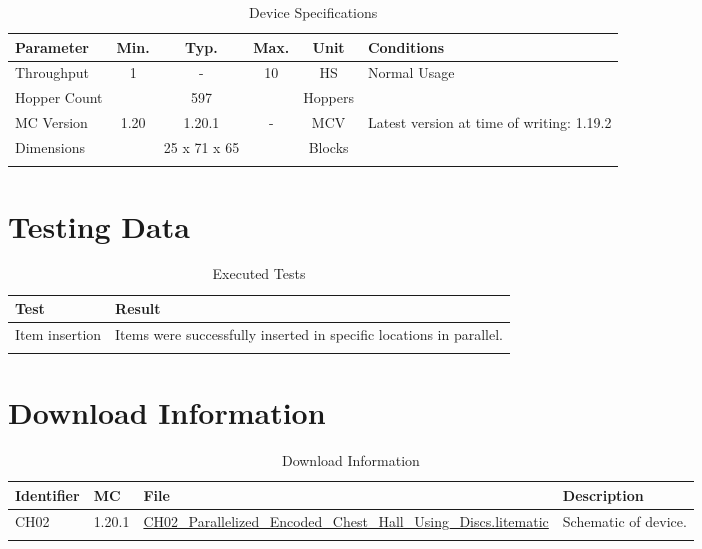 \documentclass[10pt]{datasheet}
\begin{document}
\begin{table}[H]
    \caption{Device Specifications}
    \begin{tabularx}{\textwidth}{l | c c c | c | X}
        \thickhline
        \textbf{Parameter} & \textbf{Min.} & \textbf{Typ.} & \textbf{Max.} &
        \textbf{Unit} & \textbf{Conditions} \\
        \hline
        Throughput  & 1 & - & 10 & HS & Normal Usage \\
        \hline
        Hopper Count & & 597 & & Hoppers & \\
        \hline
        MC Version & 1.20 & 1.20.1 & - & MCV & Latest version at time of writing: 1.19.2\\
        \hline
        Dimensions & & 25 x 71 x 65 & & Blocks & \\
        \thickhline
\end{tabularx}
\end{table}

\section{Testing Data}

\begin{table}[H]
\caption{Executed Tests}
\begin{tabularx}{\textwidth}{l | X}
    \thickhline
    \textbf{Test} & \textbf{Result} \\
    \hline
    Item insertion & Items were successfully inserted in specific locations in parallel. \\
    \thickhline
\end{tabularx}
\end{table}

\section{Download Information}
\begin{table}[H]
    \caption{Download Information}
    \begin{tabularx}{\textwidth}{l | l | l | X}
        \thickhline
        \textbf{Identifier} & \textbf{MC} & \textbf{File} & \textbf{Description} \\
        \hline
        CH02 & 1.20.1 & \href{https://github.com/Soontech-Annals/Archive/blob/8413f90a054b6c415703bae02badeba7541344f6/Archive/chest-halls/CH02\%20Parallelized\%20Encoded\%20Chest\%20Hall\%20Using\%20Discs/CH02\_Parallelized\_Encoded\_Chest\_Hall\_Using\_Discs.litematic?raw=1}{CH02\_Parallelized\_Encoded\_Chest\_Hall\_Using\_Discs.litematic} & Schematic of device. \\
        \hline
        \thickhline
    \end{tabularx}
\end{table}
\end{document}
